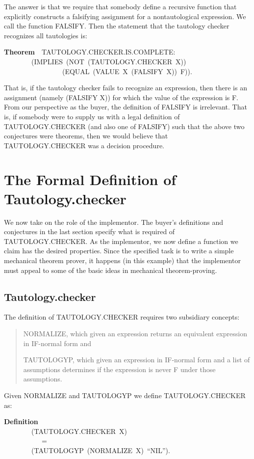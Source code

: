 \documentclass[10pt]{book}
\newenvironment{pubasis}{\begin{flushleft}}{\end{flushleft}}
\newenvironment{pubcrown}{\begin{quote}}{\end{quote}}
\newcommand{\axiomordefinition}[1]{\vspace{6pt}\Large\textsf{\textbf{#1}}\normalsize}
\begin{document}
The answer is that we  require that somebody define  a recursive
function that explicitly constructs a falsifying assignment for a nontautological expression.
We  call the function FALSIFY.  Then the statement that the tautology checker
recognizes all tautologies is:
\begin{pubasis}
\axiomordefinition{Theorem}~~TAUTOLOGY.CHECKER.IS.COMPLETE:\\
~~~~~~~~(IMPLIES~(NOT~(TAUTOLOGY.CHECKER~X))\\
~~~~~~~~~~~~~~~~~(EQUAL~(VALUE~X~(FALSIFY~X))~F)).\\
\end{pubasis}
That is, if the tautology checker fails to recognize an expression, then
there is an assignment (namely  (FALSIFY X)) 
for which the value of the expression is F.
From our perspective as the buyer,
the definition of FALSIFY is irrelevant.  That is, if somebody were to supply us with a legal definition of
TAUTOLOGY.CHECKER (and also one of FALSIFY) such that the above
two conjectures were theorems, then we would believe that TAUTOLOGY.CHECKER
was a decision procedure.
\section{The Formal Definition of Tautology.checker}
We now take on the role of the implementor.
The buyer's definitions and conjectures in the last section specify what
is required of TAUTOLOGY.CHECKER.  As the implementor, we now define a function we claim
has the desired properties.  Since the specified task is to write a simple
mechanical theorem prover, it happens (in this example) that the
implementor must appeal to some of the basic ideas in mechanical
theorem-proving.

\subsection{Tautology.checker}
The definition of TAUTOLOGY.CHECKER requires two subsidiary concepts:
\begin{pubcrown}
NORMALIZE, which given an expression returns an equivalent expression
in IF-normal form and

TAUTOLOGYP, which given an expression in IF-normal form
and a list of assumptions determines if the expression is
never F under those assumptions.
\end{pubcrown}

Given NORMALIZE and TAUTOLOGYP we  define
TAUTOLOGY.CHECKER as:
\begin{pubasis}
\axiomordefinition{Definition}\\
~~~~~~~~(TAUTOLOGY.CHECKER~X)\\
~~~~~~~~~~~=\\
~~~~~~~~(TAUTOLOGYP~(NORMALIZE~X)~``NIL'').\\
\end{pubasis}
\end{document}
